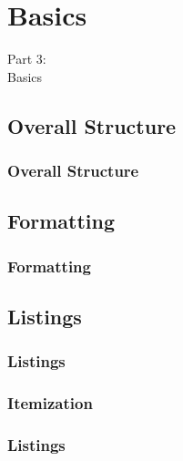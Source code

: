 
{
\renewcommand{\bgcolor}{basics}

\section{Basics}
\begin{frame}
  \vspace{25mm}
  \begin{center}
    \Huge{Part 3:\\Basics}
  \end{center}
\end{frame}

\subsection{Overall Structure}
\begin{frame}[fragile]
  \frametitle{Overall Structure}
  \vspace{3mm}
  
\end{frame}

\subsection{Formatting}
\begin{frame}[fragile]
  \frametitle{Formatting}
  \vspace{3mm}
  
\end{frame}

\subsection{Listings}
\begin{frame}[fragile]
  \frametitle{Listings}
  \vspace{3mm}
  
\end{frame}

\subsubsection{Itemization}
\begin{frame}[fragile]
  \frametitle{Listings }
  \vspace{3mm}
  

\end{frame}}
